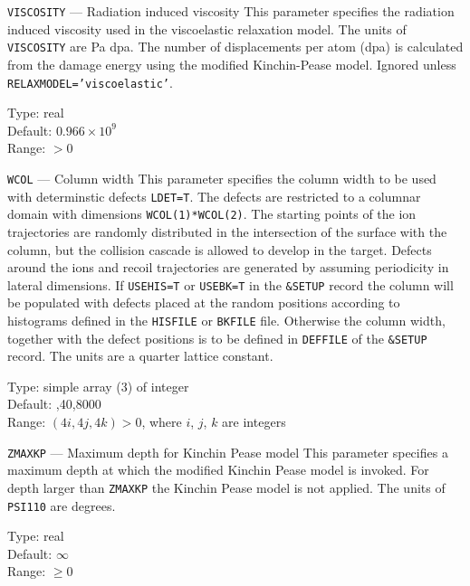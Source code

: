 \begin{keydescription}{\texttt{VISCOSITY} --- Radiation induced viscosity}
%
  This parameter specifies the radiation induced viscosity used in the 
  viscoelastic relaxation model. The units of \texttt{VISCOSITY} are Pa dpa.
  The number of displacements per atom (dpa) is calculated from the damage 
  energy using the modified Kinchin-Pease model. Ignored unless 
  \texttt{RELAXMODEL='viscoelastic'}.
  \begin{keytab}
    Type:    \> real \\
    Default: \> $0.966 \times 10^9$ \\
    Range:   \> $>0$
  \end{keytab}
\end{keydescription}

\ifprivate
\begin{keydescription}{\texttt{WCOL} --- Column width}
%
  This parameter specifies the column width to be used with
  determinstic defects \texttt{LDET=T}. The defects are restricted to a
  columnar domain with dimensions \texttt{WCOL(1)*WCOL(2)}. The starting
  points of the ion trajectories are randomly distributed in the intersection
  of the surface with the column, but the collision cascade is allowed to
  develop in the target. Defects around the ions and recoil trajectories are
  generated by assuming periodicity in lateral dimensions.  If
  \texttt{USEHIS=T} or \texttt{USEBK=T} in the \texttt{\&SETUP} record the
  column will be populated with defects placed at the random positions
  according to histograms defined in the \texttt{HISFILE} or \texttt{BKFILE} file.
  Otherwise the column width, together with the defect positions is to be defined
  in \texttt{DEFFILE} of the \texttt{\&SETUP} record. The units are a quarter
  lattice constant.
  \begin{keytab} 
    Type: \> simple array (3) of integer \\ 
    Default: ,40,8000 \\
    Range: \> $(4i,4j,4k)>0$, where $i$, $j$, $k$ are integers \\ 
  \end{keytab}
\end{keydescription}
\fi

\begin{keydescription}{\texttt{ZMAXKP} --- Maximum depth for Kinchin
    Pease model}
%
  This parameter specifies a maximum depth at which the modified
  Kinchin Pease model is invoked. For depth larger than
  \texttt{ZMAXKP} the Kinchin Pease model is not applied.  The units
  of \texttt{PSI110} are degrees.
  \begin{keytab}
    Type:    \> real \\
    Default: \> $\infty$ \\
    Range:   \> $\ge 0$
  \end{keytab}
\end{keydescription}

